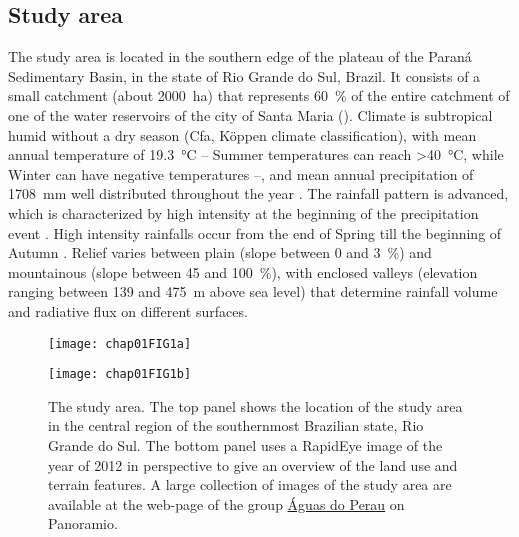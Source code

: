 \subsection{Study area}
\label{sec:intro-study-area}

The study area is located in the southern edge of the plateau of the Paraná Sedimentary Basin, in 
the state of Rio Grande do Sul, Brazil. It consists of a small catchment (about \SI{2000}{\hectare}) 
that represents \SI{60}{\percent} of the entire catchment of one of the water reservoirs of the city
of Santa Maria (). Climate is subtropical humid without a dry season (Cfa, 
Köppen climate classification), with mean annual temperature of \SI{19.3}{\celsius} -- Summer 
temperatures can reach \SI{>40}{\celsius}, while Winter can have negative temperatures
\citep{HeldweinEtAl2009} --, and mean annual precipitation of \SI{1708}{\milli\metre} well 
distributed throughout the year \citep{Maluf2000}. The rainfall pattern is advanced, which is 
characterized by high intensity at the beginning of the precipitation event \citep{MehlEtAl2001}. 
High intensity rainfalls occur from the end of Spring till the beginning of Autumn 
\citep{MouraBueno2012}. Relief varies between plain (slope between \num{0} and \SI{3}{\percent}) and
mountainous (slope between \num{45} and \SI{100}{\percent}), with enclosed valleys (elevation 
ranging between \num{139} and \SI{475}{\metre} above sea level) that determine rainfall volume and 
radiative flux on different surfaces.

\begin{figure}[!ht]
    \centering
    \begin{minipage}[b]{95mm}
      \subcaption{}
      \label{fig:brazil}
      \centering
      \texttt{[image: chap01FIG1a]}
    \end{minipage}
    \begin{minipage}[b]{95mm}
      \subcaption{}
      \label{fig:points}
      \centering
      \texttt{[image: chap01FIG1b]}
    \end{minipage}
  \caption{The study area. The top panel shows the location of the study area in the central region 
  of the southernmost Brazilian state, Rio Grande do Sul. The bottom panel uses a RapidEye image
  of the year of 2012 in perspective to give an overview of the land use and terrain features.
  A large collection of images of the study area are available at the web-page of the group
  \href{http://www.panoramio.com/group/130903}{Águas do Perau} on Panoramio.}
  \label{fig:intro-location}
\end{figure}

